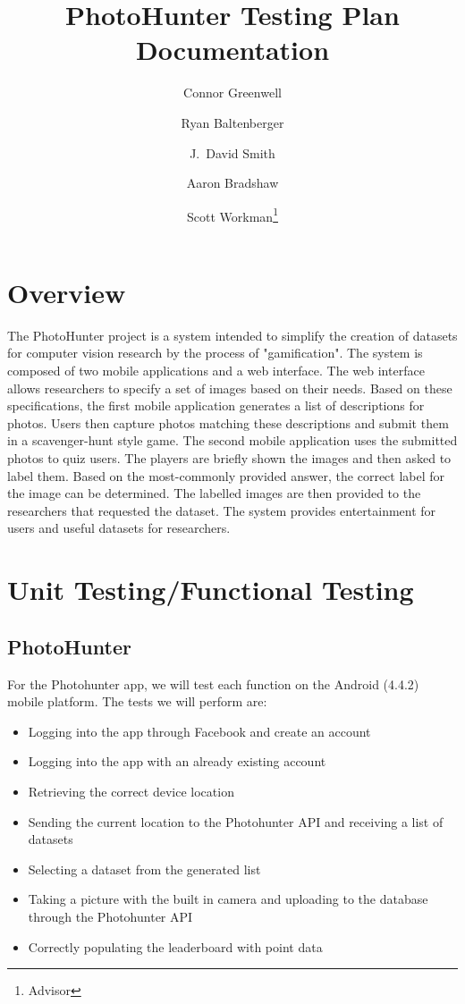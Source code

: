 \documentclass{article}
\title{PhotoHunter Testing Plan Documentation
}
\author{Connor Greenwell \and Ryan Baltenberger
  \and J.\ David Smith \and Aaron Bradshaw
\and Scott Workman\footnote{Advisor}}
\begin{document}
\maketitle

\section{Overview}
The PhotoHunter project is a system intended to simplify the creation of
datasets for computer vision research by the process of "gamification". The
system is composed of two mobile applications and a web interface. The web
interface allows researchers to specify a set of images based on their needs.
Based on these specifications, the first mobile application generates a list of
descriptions for photos. Users then capture photos matching these descriptions
and submit them in a scavenger-hunt style game. The second mobile application
uses the submitted photos to quiz users. The players are briefly shown the
images and then asked to label them. Based on the most-commonly provided
answer, the correct label for the image can be determined. The labelled images
are then provided to the researchers that requested the dataset. The system
provides entertainment for users and useful datasets for researchers.

\section{Unit Testing/Functional Testing}
\subsection{PhotoHunter}

For the Photohunter app, we will test each function on the Android (4.4.2)
mobile platform.  The tests we will perform are:
\begin{itemize}

  \item Logging into the app through Facebook and create an account
 
  \item Logging into the app with an already existing account

  \item Retrieving the correct device location

  \item Sending the current location to the Photohunter API and receiving
        a list of datasets

  \item Selecting a dataset from the generated list
  
  \item Taking a picture with the built in camera and uploading to the 
        database through the Photohunter API

  \item Correctly populating the leaderboard with point data

\end{itemize}
\end{document}
